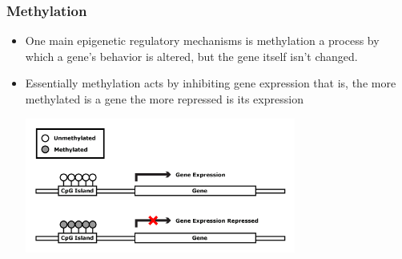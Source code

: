 \documentclass[handout]{beamer}
\begin{document}
\begin{frame}[fragile]\frametitle{Methylation}
\begin{itemize}
\item One main epigenetic regulatory mechanisms is methylation a process by which a gene's behavior is altered, but the gene itself isn't changed.
\item Essentially methylation acts by inhibiting gene expression that is, the more methylated is a gene the more repressed is its expression
\begin{center}
\includegraphics[width=0.7\textwidth]{./images/methylationAction1.png}
\end{center}
\end{itemize} 
\end{frame}
\end{document}
